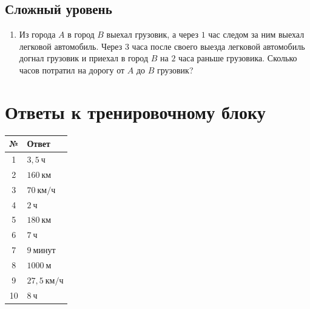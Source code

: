 \documentclass[a4paper,12pt]{article}
\newcommand{\kmh}{\text{км/ч}}
\newcommand{\km}{\text{км}}
\newcommand{\ch}{\text{ч}}
\newcommand{\m}{\text{м}}
\begin{document}
\subsection*{Сложный уровень}

\begin{enumerate}[resume]
    \item Из города $A$ в город $B$ выехал грузовик, а через $1$ час следом за ним выехал легковой автомобиль. Через $3$ часа после своего выезда легковой автомобиль догнал грузовик и приехал в город $B$ на $2$ часа раньше грузовика. Сколько часов потратил на дорогу от $A$ до $B$ грузовик?
\end{enumerate}

\newpage

\section{Ответы к тренировочному блоку}

\begin{center}
\renewcommand{\arraystretch}{1.35}
\begin{tabularx}{0.9\linewidth}{c X}
\toprule
\textbf{№} & \textbf{Ответ} \\
\midrule
1 & $3{,}5\ \ch$ \\
2 & $160\ \km$ \\
3 & $70\ \kmh$ \\
4 & $2\ \ch$ \\
5 & $180\ \km$ \\
6 & $7\ \ch$ \\
7 & $9\ \text{минут}$ \\
8 & $1000\ \m$ \\
9 & $27{,}5\ \kmh$ \\
10 & $8\ \ch$ \\
\bottomrule
\end{tabularx}
\end{center}
\end{document}
